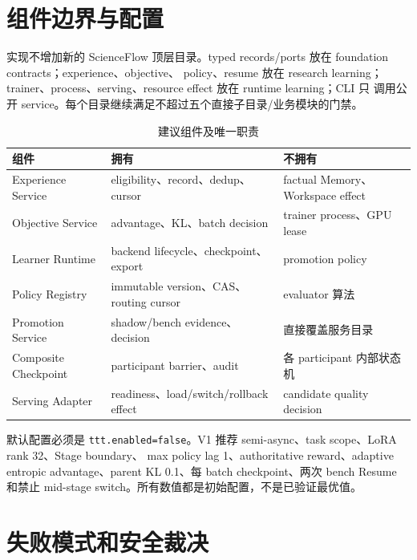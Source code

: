 \documentclass[UTF8,11pt,a4paper]{ctexart}
\newcommand{\code}[1]{\texttt{#1}}
\begin{document}
\section{组件边界与配置}

实现不增加新的 ScienceFlow 顶层目录。typed records/ports 放在 foundation contracts；experience、objective、
policy、resume 放在 research learning；trainer、process、serving、resource effect 放在 runtime learning；CLI 只
调用公开 service。每个目录继续满足不超过五个直接子目录/业务模块的门禁。

\begin{table}[htbp]
  \centering
  \caption{建议组件及唯一职责}
  \begin{tabularx}{\textwidth}{@{}L{3.0cm}YY@{}}
    \toprule
    组件 & 拥有 & 不拥有 \\
    \midrule
    Experience Service & eligibility、record、dedup、cursor & factual Memory、Workspace effect \\
    Objective Service & advantage、KL、batch decision & trainer process、GPU lease \\
    Learner Runtime & backend lifecycle、checkpoint、export & promotion policy \\
    Policy Registry & immutable version、CAS、routing cursor & evaluator 算法 \\
    Promotion Service & shadow/bench evidence、decision & 直接覆盖服务目录 \\
    Composite Checkpoint & participant barrier、audit & 各 participant 内部状态机 \\
    Serving Adapter & readiness、load/switch/rollback effect & candidate quality decision \\
    \bottomrule
  \end{tabularx}
\end{table}

默认配置必须是 \code{ttt.enabled=false}。V1 推荐 semi-async、task scope、LoRA rank 32、Stage boundary、
max policy lag 1、authoritative reward、adaptive entropic advantage、parent KL 0.1、每 batch checkpoint、两次
bench Resume 和禁止 mid-stage switch。所有数值都是初始配置，不是已验证最优值。

\section{失败模式和安全裁决}
\end{document}
